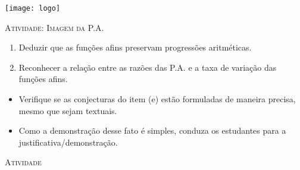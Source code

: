\documentclass[10 pt,usenames,dvipsnames, oneside]{article}
\begin{document}
\begin{center}
  \begin{minipage}[l]{3cm}
\texttt{[image: logo]}    
\end{minipage}\hfill
\begin{minipage}[r]{.8\textwidth}
 {\Large \scshape Atividade: Imagem da P.A.}  
\end{minipage}
\end{center}
\vspace{.2cm}

\ifdefined\prof
\begin{objetivos}
\item \phantom{a}
\end{objetivos}

\begin{goals}
\begin{enumerate}
\item Deduzir que as funções afins preservam progressões aritméticas.
\item Reconhecer a relação entre as razões das P.A. e a taxa de variação das funções afins.
\end{enumerate}

\tcblower

\begin{itemize}
\item Verifique se as conjecturas do item (e) estão formuladas de maneira precisa, mesmo que sejam textuais.
\item Como a demonstração desse fato é simples, conduza os estudantes para a justificativa/demonstração.
\end{itemize}

\end{goals}

\bigskip
\begin{center}
{\large \scshape Atividade}
\end{center}
\fi
\end{document}

